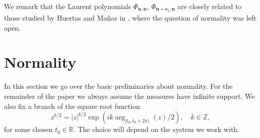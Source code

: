 \documentclass[reqno,centertags,11pt,draft]{amsart}
\newcommand{\R}{\mathbb{R}}
\newcommand{\Z}{\mathbb{Z}}
\begin{document}
We remark that the Laurent polynomials $\Phi_{\bm{n},\bm{n}}$, $\Phi_{\bm{n}+\bm{e}_j,\bm{n}}$ are closely related to those studied by Huertas and Ma\~nas in \cite{HueMan}, where the question of normality was left open.







\section{Normality}\label{normality section}


In this section we go over the basic preliminaries about normality. For the remainder of the paper we always assume the measures have infinite support. We also fix a branch of the square root function 
\begin{equation}\label{eq:sqrt}
z^{k/2}=|z|^{k/2} \exp({i k\arg_{[t_0,t_0+2\pi)}} (z)/2), \quad k \in \Z,
\end{equation}
for some chosen $t_0\in\R$. The choice will depend on the system we work with. 
\end{document}
